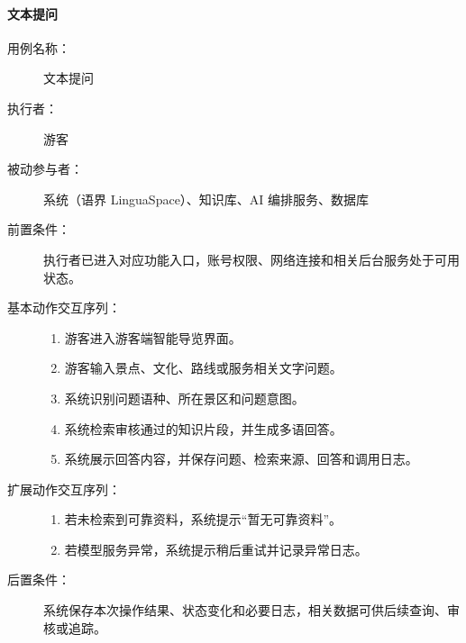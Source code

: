 \paragraph{文本提问}
\begin{description}
  \item[用例名称：] 文本提问
  \item[执行者：] 游客
  \item[被动参与者：] 系统（语界 LinguaSpace）、知识库、AI 编排服务、数据库
  \item[前置条件：] 执行者已进入对应功能入口，账号权限、网络连接和相关后台服务处于可用状态。
  \item[基本动作交互序列：]
  \begin{enumerate}
    \item 游客进入游客端智能导览界面。
    \item 游客输入景点、文化、路线或服务相关文字问题。
    \item 系统识别问题语种、所在景区和问题意图。
    \item 系统检索审核通过的知识片段，并生成多语回答。
    \item 系统展示回答内容，并保存问题、检索来源、回答和调用日志。
  \end{enumerate}
  \item[扩展动作交互序列：]
  \begin{enumerate}
    \item[4a.] 若未检索到可靠资料，系统提示“暂无可靠资料”。
    \item[4b.] 若模型服务异常，系统提示稍后重试并记录异常日志。
  \end{enumerate}
  \item[后置条件：] 系统保存本次操作结果、状态变化和必要日志，相关数据可供后续查询、审核或追踪。
\end{description}

